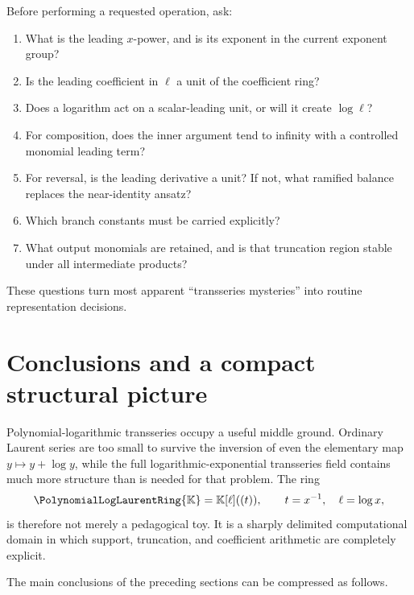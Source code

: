 \documentclass[11pt,oneside]{article}
\numberwithin{equation}{section}
\theoremstyle{definition}
\newcommand{\K}{\mathbb{K}}
\newcommand{\PL}{\PolynomialLogLaurentRing{\K}}
\begin{document}
Before performing a requested operation, ask:
\begin{enumerate}
\item What is the leading \(x\)-power, and is its exponent in the current
  exponent group?
\item Is the leading coefficient in \(\ell\) a unit of the coefficient ring?
\item Does a logarithm act on a scalar-leading unit, or will it create
  \(\log\ell\)?
\item For composition, does the inner argument tend to infinity with a
  controlled monomial leading term?
\item For reversal, is the leading derivative a unit?  If not, what ramified
  balance replaces the near-identity ansatz?
\item Which branch constants must be carried explicitly?
\item What output monomials are retained, and is that truncation region stable
  under all intermediate products?
\end{enumerate}
These questions turn most apparent ``transseries mysteries'' into routine
representation decisions.

\section{Conclusions and a compact structural picture}\label{sec:conclusion}

Polynomial-logarithmic transseries occupy a useful middle ground.  Ordinary
Laurent series are too small to survive the inversion of even the elementary
map \(y\mapsto y+\log y\), while the full logarithmic-exponential transseries
field contains much more structure than is needed for that problem.  The ring
\[
  \PL=\K[\ell]((t)),\qquad t=x^{-1},\quad \ell=\log x,
\]
is therefore not merely a pedagogical toy.  It is a sharply delimited
computational domain in which support, truncation, and coefficient arithmetic
are completely explicit.

The main conclusions of the preceding sections can be compressed as follows.
\end{document}
